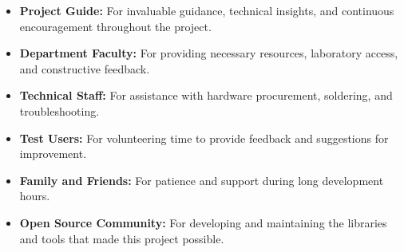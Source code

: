 \begin{itemize}
    \item \textbf{Project Guide:} For invaluable guidance, technical insights, and continuous encouragement throughout the project.
    \item \textbf{Department Faculty:} For providing necessary resources, laboratory access, and constructive feedback.
    \item \textbf{Technical Staff:} For assistance with hardware procurement, soldering, and troubleshooting.
    \item \textbf{Test Users:} For volunteering time to provide feedback and suggestions for improvement.
    \item \textbf{Family and Friends:} For patience and support during long development hours.
    \item \textbf{Open Source Community:} For developing and maintaining the libraries and tools that made this project possible.
\end{itemize}